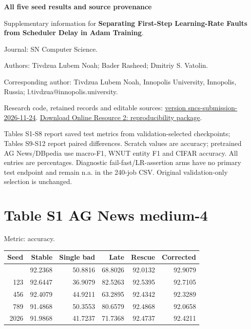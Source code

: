 \documentclass[11pt,a4paper]{article}
\begin{document}
\begin{center}{\Large\bfseries All five seed results and source provenance}\end{center}
Supplementary information for \textbf{Separating First-Step Learning-Rate Faults from Scheduler Delay in Adam Training}.

Journal: SN Computer Science.

Authors: Tivdzua Lubem Noah; Bader Rasheed; Dmitriy S. Vatolin.

Corresponding author: Tivdzua Lubem Noah, Innopolis University, Innopolis, Russia; l.tivdzua@innopolis.university.

Research code, retained records and editable sources: \href{https://github.com/tivdzualubem/warmup-update-budget-acml2026/tree/sncs-submission-2026-11-24}{version sncs-submission-2026-11-24}. \href{https://github.com/tivdzualubem/warmup-update-budget-acml2026/raw/refs/tags/sncs-submission-2026-11-24/submission/sncs-2026-11-24/ESM_2.zip}{Download Online Resource 2: reproducibility package}.

Tables S1-S8 report saved test metrics from validation-selected checkpoints; Tables S9-S12 report paired differences. Scratch values are accuracy; pretrained AG News/DBpedia use macro-F1, WNUT entity F1 and CIFAR accuracy. All entries are percentages. Diagnostic fail-fast/LR-assertion arms have no primary test endpoint and remain n.a. in the 240-job CSV. Original validation-only selection is unchanged.


\section{Table S1 AG News medium-4}\label{table-s1-ag-news-medium-4}

Metric: accuracy.

\begin{longtable}[]{@{}rrrrrr@{}}
\toprule\noalign{}
Seed & Stable & Single bad & Late & Rescue & Corrected \\
\midrule\noalign{}
\endhead
\bottomrule\noalign{}
\endlastfoot
42 & 92.2368 & 50.8816 & 68.8026 & 92.0132 & 92.9079 \\
123 & 92.6447 & 36.9079 & 82.5263 & 92.5395 & 92.7105 \\
456 & 92.4079 & 44.9211 & 63.2895 & 92.4342 & 92.3289 \\
789 & 91.4868 & 50.3553 & 80.6579 & 92.4868 & 92.0658 \\
2026 & 91.9868 & 41.7237 & 71.7368 & 92.4737 & 92.4211 \\
\end{longtable}
\end{document}
